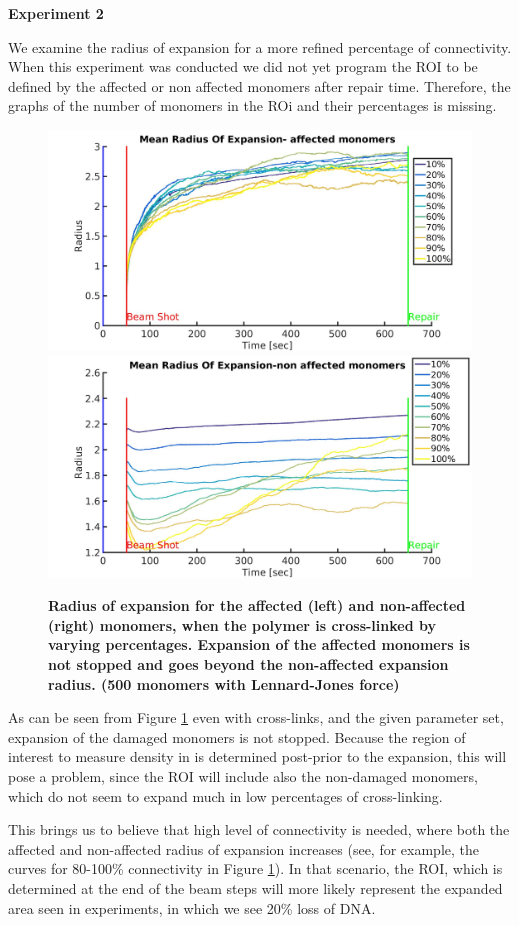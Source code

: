 \documentclass[12pt]{report}
\begin{document}
				
	     \textbf{Experiment 2}
		     
	     We examine the radius of expansion for a more refined percentage of connectivity. When this experiment was conducted we did not yet program the ROI to be defined by the affected or non affected monomers after repair time. Therefore, the graphs of the number of monomers in the ROi and their percentages is missing. 
		     	     
	 	\begin{figure}[H]
	     \includegraphics[width=0.5\linewidth,height=0.3\textheight]{RadiusOfExpansion500BeadsAffectedLennardJonesCrosslinked}
	     \includegraphics[width=0.5\linewidth,height=0.3\textheight]{RadiusOfExpansion500BeadsNonAffectedLennardJonesCrosslinked}
	      \caption{\tiny{\textbf{Radius of expansion for the affected (left) and non-affected (right) monomers, when the polymer is cross-linked by varying percentages. Expansion of the affected monomers is not stopped and goes beyond the non-affected expansion radius. (500 monomers with Lennard-Jones force)}}}
		     \label{fig:RadiusOfExpansion500BeadsAffectedLennardJonesCrosslinked}
    	\end{figure}
		      		
     	As can be seen from Figure \ref{fig:RadiusOfExpansion500BeadsAffectedLennardJonesCrosslinked} even with cross-links, and the given parameter set, expansion of the damaged monomers is not stopped. 
	  	Because the region of interest to measure density in is determined post-prior to the expansion, this will pose a problem, since the ROI will include also the non-damaged monomers, which do not seem to expand much in low percentages of cross-linking.
		      		
	  	This brings us to believe that high level of connectivity is needed, where both the affected and non-affected radius of expansion increases (see, for example, the curves for 80-100\% connectivity in Figure \ref{fig:RadiusOfExpansion500BeadsAffectedLennardJonesCrosslinked}). In that scenario, the ROI, which is determined at the end of the beam steps will more likely represent the expanded area seen in experiments, in which we see 20\% loss of DNA. 
		      		
\end{document}
